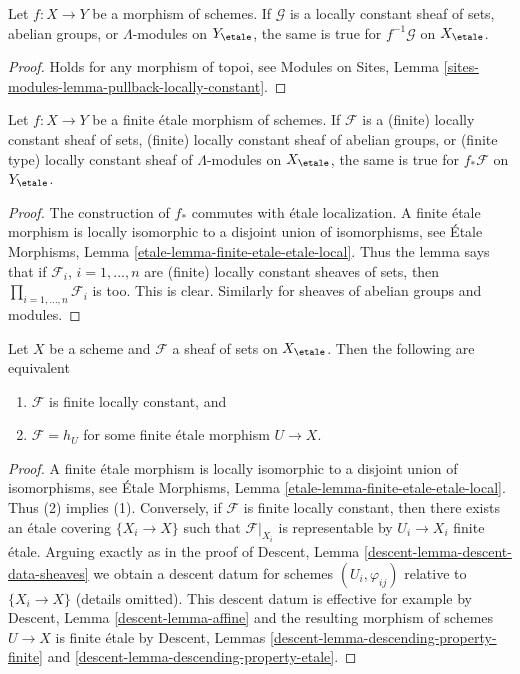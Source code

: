 \begin{lemma}
\label{lemma-pullback-locally-constant}
Let $f : X \to Y$ be a morphism of schemes. If $\mathcal{G}$ is a
locally constant sheaf of sets, abelian groups, or $\Lambda$-modules
on $Y_\etale$, the same is true for $f^{-1}\mathcal{G}$
on $X_\etale$.
\end{lemma}

\begin{proof}
Holds for any morphism of topoi, see
Modules on Sites, Lemma \ref{sites-modules-lemma-pullback-locally-constant}.
\end{proof}

\begin{lemma}
\label{lemma-pushforward-locally-constant}
Let $f : X \to Y$ be a finite \'etale morphism of schemes.
If $\mathcal{F}$ is a (finite) locally constant sheaf of sets,
(finite) locally constant sheaf of abelian groups, or
(finite type) locally constant sheaf of $\Lambda$-modules
on $X_\etale$, the same is true for $f_*\mathcal{F}$
on $Y_\etale$.
\end{lemma}

\begin{proof}
The construction of $f_*$ commutes with \'etale localization.
A finite \'etale morphism is locally isomorphic to a disjoint union
of isomorphisms, see
\'Etale Morphisms, Lemma \ref{etale-lemma-finite-etale-etale-local}.
Thus the lemma says that if $\mathcal{F}_i$, $i = 1, \ldots, n$
are (finite) locally constant sheaves of sets, then
$\prod_{i = 1, \ldots, n} \mathcal{F}_i$ is too.
This is clear. Similarly for sheaves of abelian groups and modules.
\end{proof}

\begin{lemma}
\label{lemma-characterize-finite-locally-constant}
Let $X$ be a scheme and $\mathcal{F}$ a sheaf of sets on $X_\etale$.
Then the following are equivalent
\begin{enumerate}
\item $\mathcal{F}$ is finite locally constant, and
\item $\mathcal{F} = h_U$ for some finite \'etale morphism $U \to X$.
\end{enumerate}
\end{lemma}

\begin{proof}
A finite \'etale morphism is locally isomorphic to a disjoint union
of isomorphisms, see
\'Etale Morphisms, Lemma \ref{etale-lemma-finite-etale-etale-local}.
Thus (2) implies (1). Conversely, if $\mathcal{F}$ is finite locally
constant, then there exists an \'etale covering $\{X_i \to X\}$ such that
$\mathcal{F}|_{X_i}$ is representable by $U_i \to X_i$ finite \'etale.
Arguing exactly as in the proof of
Descent, Lemma \ref{descent-lemma-descent-data-sheaves}
we obtain a descent datum for schemes $(U_i, \varphi_{ij})$ relative to
$\{X_i \to X\}$ (details omitted). This descent datum is effective for
example by Descent, Lemma \ref{descent-lemma-affine}
and the resulting morphism of schemes $U \to X$ is finite \'etale
by Descent, Lemmas \ref{descent-lemma-descending-property-finite} and
\ref{descent-lemma-descending-property-etale}.
\end{proof}

